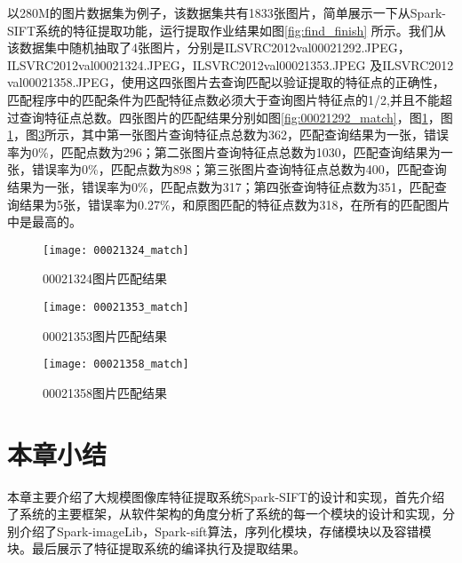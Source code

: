以280M的图片数据集为例子，该数据集共有1833张图片，简单展示一下从Spark-SIFT系统的特征提取功能，运行提取作业结果如图\ref{fig:find_finish} 所示。我们从该数据集中随机抽取了4张图片，分别是ILSVRC2012\textunderscore val\textunderscore00021292.JPEG，ILSVRC2012\textunderscore val\textunderscore00021324.JPEG，ILSVRC2012\textunderscore val\textunderscore00021353.JPEG 及ILSVRC2012\textunderscore\\val\textunderscore00021358.JPEG，使用这四张图片去查询匹配以验证提取的特征点的正确性，匹配程序中的匹配条件为匹配特征点数必须大于查询图片特征点的1/2,并且不能超过查询特征点总数。四张图片的匹配结果分别如图\ref{fig:00021292_match}，图\ref{fig:00021324_match}，图\ref{fig:00021324_match}，图\ref{fig:00021358_match}所示，其中第一张图片查询特征点总数为362，匹配查询结果为一张，错误率为0\%，匹配点数为296；第二张图片查询特征点总数为1030，匹配查询结果为一张，错误率为0\%，匹配点数为898；第三张图片查询特征点总数为400，匹配查询结果为一张，错误率为0\%，匹配点数为317；第四张查询特征点数为351，匹配查询结果为5张，错误率为0.27\%，和原图匹配的特征点数为318，在所有的匹配图片中是最高的。

\begin{figure}[htp]
\centering
\texttt{[image: 00021324\_match]}
\caption{00021324图片匹配结果}
\label{fig:00021324_match}
\end{figure}

\begin{figure}[htp]
\centering
\texttt{[image: 00021353\_match]}
\caption{00021353图片匹配结果}
\label{fig:00021353_match}
\end{figure}

\begin{figure}[htp]
\centering
\texttt{[image: 00021358\_match]}
\caption{00021358图片匹配结果}
\label{fig:00021358_match}
\end{figure}

\section{本章小结}
本章主要介绍了大规模图像库特征提取系统Spark-SIFT的设计和实现，首先介绍了系统的主要框架，从软件架构的角度分析了系统的每一个模块的设计和实现，分别介绍了Spark-imageLib，Spark-sift算法，序列化模块，存储模块以及容错模块。最后展示了特征提取系统的编译执行及提取结果。
